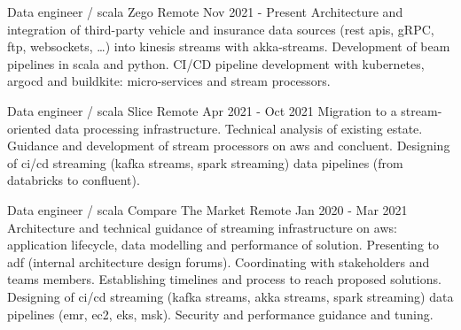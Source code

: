 
\newcommand*{\logo}[2]{\raisebox{-0.2em}{\texttt{[image: \#2]}}\hspace{0.25em}#1}


\begin{cventries}

  \cventry
    {Data engineer / scala} %
    {\logo{\zego Zego}{../../../images/zego.jpg}} %
    {Remote} %
    {Nov 2021 - Present} %
    {} %
    {
      Architecture and integration of third-party vehicle and insurance data sources (rest apis, gRPC, ftp, websockets, \dots) into kinesis streams with akka-streams. Development of beam pipelines in scala and python. CI/CD pipeline development
      with kubernetes, argocd and buildkite: micro-services and stream processors. 
    }


  \cventry
    {Data engineer / scala} %
    {\logo{\slice Slice}{../../../images/slice.png}} %
    {Remote} %
    {Apr 2021 - Oct 2021} %
    {} %
    {
      Migration to a stream-oriented data processing infrastructure. 
      Technical analysis of existing estate. Guidance and development of stream processors on aws and concluent. 
      Designing of ci/cd streaming (kafka streams, spark streaming) data pipelines (from databricks to confluent).
    }

  \cventry
    {Data engineer / scala} %
    {\logo{\ctm Compare The Market}{../../../images/ctm.png}} %
    {Remote} %
    {Jan 2020 - Mar 2021} %
    {} %
    {
      Architecture and technical guidance of streaming infrastructure on aws: application lifecycle, data modelling and performance of solution. 
      Presenting to adf (internal architecture design forums). Coordinating with stakeholders and teams members. Establishing timelines 
      and process to reach proposed solutions.
      Designing of ci/cd streaming (kafka streams, akka streams, spark streaming) data pipelines (emr, ec2, eks, msk).
      Security and performance guidance and tuning. 
    }


\end{cventries}
